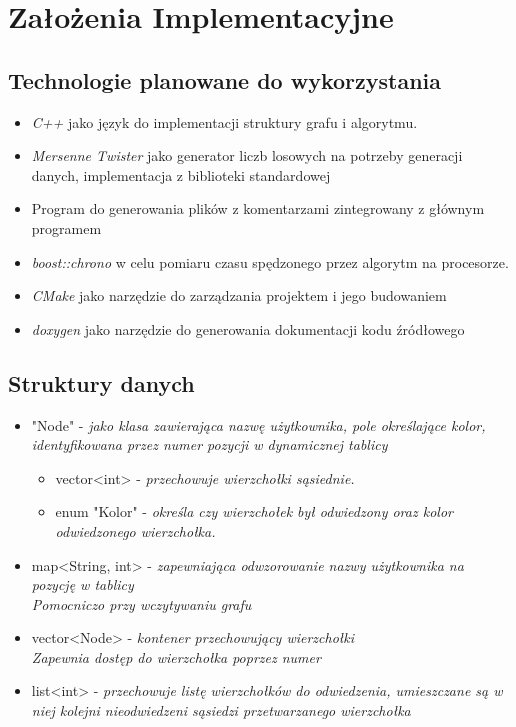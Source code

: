 \documentclass[11pt]{article}
\newcommand{\+}{\discretionary{\mbox{\scriptsize$\hookleftarrow$}}{}{}}
\begin{document}
\section{Założenia Implementacyjne}
\subsection{Technologie planowane do wykorzystania}
\begin{itemize}
\item
\textsl{C++} jako język do implementacji struktury grafu i algorytmu.
\item
\textsl{Mersenne Twister} jako generator liczb losowych na potrzeby generacji danych, implementacja z biblioteki standardowej
\item
Program do generowania plików z komentarzami zintegrowany z głównym programem
\item
\textsl{boost::chrono} w celu pomiaru czasu spędzonego przez algorytm na procesorze. 
\item
\textsl{CMake} jako narzędzie do zarządzania projektem i jego budowaniem
\item
\textsl{doxygen} jako narzędzie do generowania dokumentacji kodu źródłowego
\end{itemize}
\subsection{Struktury danych}
\begin{itemize}
\item
"Node" - \textsl{jako klasa zawierająca nazwę użytkownika, pole określające kolor, identyfikowana przez numer pozycji w dynamicznej tablicy}
\begin{itemize}[\textsl{W Node} :]
\item
vector<int> - \textsl{przechowuje wierzchołki sąsiednie.}
\item
enum "Kolor" - \textsl{określa czy wierzchołek był odwiedzony oraz kolor odwiedzonego wierzchołka.}
\end{itemize}
\item
map<String, int> - \textsl{zapewniająca odwzorowanie nazwy użytkownika na pozycję w tablicy} \\ 
\textsl{Pomocniczo przy wczytywaniu grafu}
\item
vector<Node> - \textsl{kontener przechowujący wierzchołki}\\ 
\textsl{Zapewnia dostęp do wierzchołka poprzez numer} 
\item 
list<int> - \textsl{przechowuje listę wierzchołków do odwiedzenia, umieszczane są w niej kolejni nieodwiedzeni sąsiedzi przetwarzanego wierzchołka}
\end{itemize}
\end{document}
